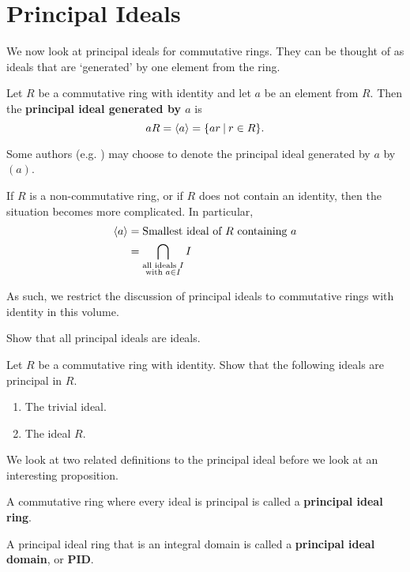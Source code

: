 \section{Principal Ideals}
We now look at principal ideals for commutative rings. They can be thought of as ideals that are `generated' by one element from the ring.
\begin{definition}
    Let $R$ be a commutative ring with identity and let $a$ be an element from $R$. Then the \textbf{principal ideal generated by $a$} is
    \[
        aR = \princ{a} = \{ar \vert r \in R\}.
    \]
\end{definition}
\begin{remark}
    Some authors (e.g. \cite{dummit_foote_2004}) may choose to denote the principal ideal generated by $a$ by $(a)$.
\end{remark}
\begin{remark}
    If $R$ is a non-commutative ring, or if $R$ does not contain an identity, then the situation becomes more complicated. In particular,
    \begin{align*}
        \left\langle a\right\rangle &= \text{Smallest ideal of } R \text{ containing }a\\
        &= \bigcap_{\substack{\text{all ideals }I \\ \text{with } a \in I}}I
    \end{align*}
    
    As such, we restrict the discussion of principal ideals to commutative rings with identity in this volume.
\end{remark}
\begin{exercise}
    Show that all principal ideals are ideals.
\end{exercise}
\begin{exercise}\label{exercise-trivial-ideal-and-whole-ring-are-principal-ideals}
    Let $R$ be a commutative ring with identity. Show that the following ideals are principal in $R$.
    \begin{enumerate}[label=(\alph*)]
        \item The trivial ideal.
        \item The ideal $R$.
    \end{enumerate}
\end{exercise}

We look at two related definitions to the principal ideal before we look at an interesting proposition.
\begin{definition}
    A commutative ring where every ideal is principal is called a \textbf{principal ideal ring}.
\end{definition}
\begin{definition}
    A principal ideal ring that is an integral domain is called a \textbf{principal ideal domain}, or \textbf{PID}.
\end{definition}

